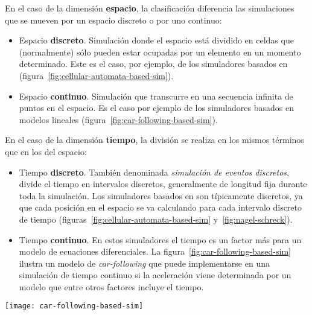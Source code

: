 En el caso de la dimensión \textbf{espacio}, la clasificación diferencia las simulaciones que se mueven por un espacio discreto o por uno continuo:

\begin{itemize}
	\item Espacio \textbf{discreto}. Simulación donde el espacio está dividido en celdas que (normalmente) sólo pueden estar ocupadas por un elemento en un momento determinado. Este es el caso, por ejemplo, de los simuladores basados en  (figura~\ref{fig:cellular-automata-based-sim}).
	\item Espacio \textbf{continuo}. Simulación que transcurre en una secuencia infinita de puntos en el espacio. Es el caso por ejemplo de los simuladores basados en modelos lineales (figura~\ref{fig:car-following-based-sim}).
\end{itemize}

En el caso de la dimensión \textbf{tiempo}, la división se realiza en los mismos términos que en los del espacio:

\begin{itemize}
	\item Tiempo \textbf{discreto}. También denominada \textit{simulación de eventos discretos}, divide el tiempo en intervalos discretos, generalmente de longitud fija durante toda la simulación. Los simuladores basados en  son típicamente discretos, ya que cada posición en el espacio se va calculando para cada intervalo discreto de tiempo (figuras~\ref{fig:cellular-automata-based-sim} y~\ref{fig:nagel-schreck}).
	\item Tiempo \textbf{continuo}. En estos simuladores el tiempo es un factor más para un modelo de ecuaciones diferenciales. La figura~\ref{fig:car-following-based-sim} ilustra un modelo de \textit{\gls{car-following}} que puede implementarse en una simulación de tiempo continuo si la aceleración viene determinada por un modelo que entre otros factores incluye el tiempo.
\end{itemize}

\begin{figure*}[t]
	\centering
	\texttt{[image: car-following-based-sim]}
	\caption[Ejemplo de modelo lineal en un espacio continuo]{Ejemplo de un modelo lineal en un espacio continuo. La posición del vehículo es un valor $x \in \mathbb{R}$. Este ejemplo muestra un modelo de \textit{\gls{car-following}} donde el comportamiento de la aceleración del vehículo es determinado por la distancia al coche siguiente. Fuente:~\cite{Tordeux2011}.}
	\label{fig:car-following-based-sim}
\end{figure*}

